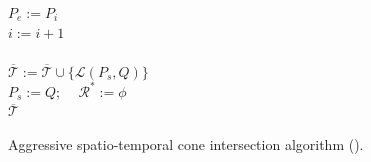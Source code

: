 {\begin{figure}[tb!]
\begin{center}
{\begin{minipage}{3.36in}
{	\icc \> \hspace{6ex} $P_e := P_i$ \\
	\icc \> \hspace{6ex} $i := i+1$ \\
	\icc \>\hspace{3ex} \Else\\
	\icc \> \hspace{6ex} $\overline{\mathcal{T}} := \overline{\mathcal{T}}\cup \{\mathcal{L}(P_s,Q)\}$ \\
	\icc \> \hspace{6ex} $P_s := Q$;  ~~$\mathcal{R}^* := \phi$ \\
	\icc \hspace{1ex}\Return $\overline{\mathcal{T}}$
%
%
}
\vspace{-2ex}
\myhrule
\end{minipage}
}
\end{center}
\vspace{-2ex}
\caption{\small Aggressive spatio-temporal cone intersection algorithm (\cista).}
\label{alg:ciseda}
\vspace{-2ex}
\end{figure}
}%


